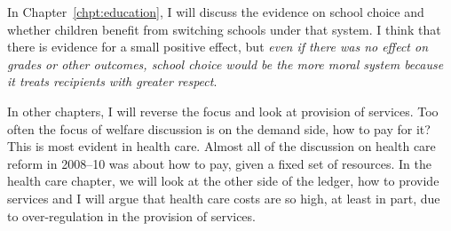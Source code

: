 In Chapter~\ref{chpt:education}, I will discuss the evidence on school choice
and whether children benefit from switching schools under that system. I think
that there is evidence for a small positive effect, but \emph{even if there was
no effect on grades or other outcomes, school choice would be the more moral
system because it treats recipients with greater respect}.

In other chapters, I will reverse the focus and look at provision of services.
Too often the focus of welfare discussion is on the demand side, how to pay for
it? This is most evident in health care. Almost all of the discussion on health
care reform in 2008--10 was about how to pay, given a fixed set of resources.
In the health care chapter, we will look at the other side of the ledger, how
to provide services and I will argue that health care costs are so high, at
least in part, due to over-regulation in the provision of services.


